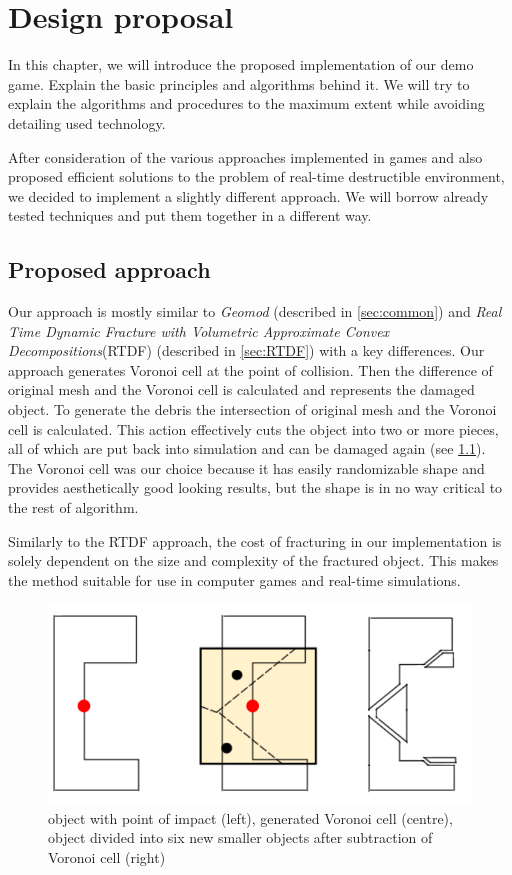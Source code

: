 \chapter{Design proposal}
In this chapter, we will introduce the proposed implementation of our demo game. Explain the basic principles and algorithms behind it. We will try to explain the algorithms and procedures to the maximum extent while avoiding detailing used technology.

After consideration of the various approaches implemented in games and also proposed efficient solutions to the problem of real-time destructible environment, we decided to implement a slightly different approach. We will borrow already tested techniques and put them together in a different way.

\section{Proposed approach}
Our approach is mostly similar to \emph{Geomod} (described in \cref{sec:common}) and \emph{Real Time Dynamic Fracture
with Volumetric Approximate Convex Decompositions}(RTDF) (described in \cref{sec:RTDF}) with a key differences. Our approach generates Voronoi cell at the point of collision. Then the difference of original mesh and the Voronoi cell is calculated and represents the damaged object. To generate the debris the intersection of original mesh and the Voronoi cell is calculated. This action effectively cuts the object into two or more pieces, all of which are put back into simulation and can be damaged again (see \cref{fig:subtraction}). The Voronoi cell was our choice because it has easily randomizable shape and provides aesthetically good looking results, but the shape is in no way critical to the rest of algorithm.

Similarly to the RTDF approach, the cost of fracturing in our implementation is solely dependent on the size and complexity of the fractured object.  This makes the method suitable for use in computer games and real-time simulations.

\begin{figure}
        \centering
        \includegraphics[width=\textwidth]{img/subtractionProcess}
        \caption{object with point of impact (left), generated Voronoi cell (centre), object divided into six new smaller objects after subtraction of Voronoi cell (right)}
        \label{fig:subtraction}
\end{figure}


